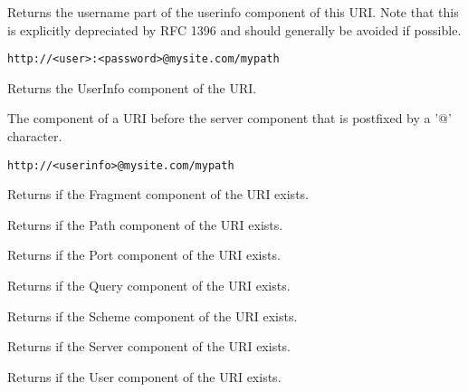 Returns the username part of the userinfo component of
this URI.  Note that this is explicitly depreciated by
RFC 1396 and should generally be avoided if possible.

\tt{http://<user>:<password>@mysite.com/mypath}


\label{wxurigetuserinfo}


Returns the UserInfo component of the URI.

The component of a URI before the server component
that is postfixed by a '@' character.

\tt{http://<userinfo>@mysite.com/mypath}


\label{wxurihasfragment}


Returns \true if the Fragment component of the URI exists.


\label{wxurihaspath}


Returns \true if the Path component of the URI exists.


\label{wxurihasport}


Returns \true if the Port component of the URI exists.


\label{wxurihasquery}


Returns \true if the Query component of the URI exists.


\label{wxurihasscheme}


Returns \true if the Scheme component of the URI exists.


\label{wxurihasserver}


Returns \true if the Server component of the URI exists.


\label{wxurihasuserinfo}


Returns \true if the User component of the URI exists.


